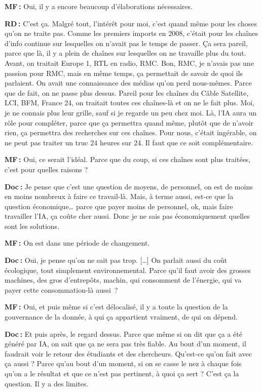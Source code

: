 \textbf{MF :} Oui, il y a encore beaucoup d'élaborations nécessaires.   

\textbf{RD :} C'est ça. Malgré tout, l'intérêt pour moi, c'est quand même pour les choses qu'on ne traite pas. Comme les premiers imports en 2008, c'était pour les chaînes d'info continue sur lesquelles on n'avait pas le temps de passer. Ça sera pareil, parce que là, il y a plein de chaînes sur lesquelles on ne travaille plus du tout. Avant, on traitait Europe 1, RTL en radio, RMC. Bon, RMC, je n'avais pas une passion pour RMC, mais en même temps, ça permettait de savoir de quoi ils parlaient. On avait une connaissance des médias qu'on perd nous-mêmes. Parce que de fait, on ne passe plus dessus. Pareil pour les chaînes du Câble Satellite, LCI, BFM, France 24, on traitait toutes ces chaînes-là et on ne le fait plus. Moi, je ne connais plus leur grille, sauf si je regarde un peu chez moi. Là, l'IA aura un rôle pour compléter, parce que ça permettra quand même, plutôt que de n’avoir rien, ça permettra des recherches sur ces chaînes. Pour nous, c'était ingérable, on ne peut pas traiter un truc 24 heures sur 24. Il faut que ce soit complémentaire.   

\textbf{MF :} Oui, ce serait l'idéal.  Parce que du coup, si ces chaînes sont plus traitées, c'est pour quelles raisons ?  

\textbf{Doc :} Je pense que c'est une question de moyens, de personnel, on est de moins en moins nombreux à faire ce travail-là. Mais, à terme aussi, est-ce que la question économique… parce que payer moins de personnel, ok, mais faire travailler l'IA, ça coûte cher aussi.  Donc je ne sais pas économiquement quelles sont les solutions.

\textbf{MF :} On est dans une période de changement.   

\textbf{Doc :} Oui, je pense qu'on ne sait pas trop. […] On parlait aussi du coût écologique, tout simplement environnemental. Parce qu'il faut avoir des grosses machines, des gros d'entrepôts, machin, qui consomment de l'énergie, qui va payer cette consommation-là aussi ?

\textbf{MF :} Oui, et puis même si c'est délocalisé, il y a toute la question de la gouvernance de la donnée, à qui ça appartient vraiment, de qui on dépend. 

\textbf{Doc :} Et puis après, le regard dessus. Parce que même si on dit que ça a été généré par IA, on sait que ça ne sera pas très fiable. Au bout d'un moment, il faudrait voir le retour des étudiants et des chercheurs. Qu'est-ce qu'on fait avec ça aussi ? Parce qu'au bout d'un moment, si on se casse le nez à chaque fois qu'on a le résultat et que ce n'est pas pertinent, à quoi ça sert ? C'est ça la question. Il y a des limites.

